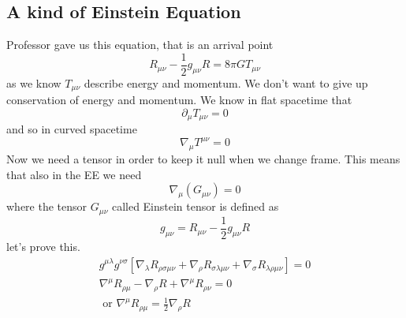 \subsection{A kind of Einstein Equation}
Professor gave us this equation, that is an arrival point
\begin{equation}
R_{\mu \nu } - \frac{1}{2}g_{\mu \nu }R = 8\pi G T_{\mu \nu }
\end{equation}
as we know $T_{\mu \nu }$ describe energy and momentum. We don't want to give up conservation of energy and momentum. 
We know in flat spacetime that
\[
\partial_{\mu }T_{\mu \nu } = 0 
\]
and so in curved spacetime 
\[
\nabla _{\mu }T^{\mu \nu }= 0
\]
Now we need a tensor in order to keep it null when we change frame. This means that also in the EE we need 
\[
\nabla _{\mu }\left( G_{\mu \nu } \right) = 0
\]
where the tensor $G_{\mu \nu }$ called Einstein tensor is defined as
\begin{equation}
g_{\mu \nu } = R_{\mu \nu } - \frac{1}{2} g_{\mu \nu }R
\end{equation}
let's prove this.
\begin{gather*}
	g^{\mu \lambda } g^{\nu \sigma } \left[ \nabla _{\lambda } R_{\rho \sigma \mu \nu } + \nabla _{\rho }R_{\sigma \lambda \mu \nu } + \nabla _{\sigma }R_{\lambda \rho \mu \nu }\right] = 0 \\
	\nabla ^{\mu }R_{\rho \mu } - \nabla _{\rho }R + \nabla ^{\mu }R_{\rho \nu }  = 0\\
	\text{ or } \nabla ^{\mu }R_{\rho \mu } = \frac{1}{2} \nabla _{\rho }R
\end{gather*}

































